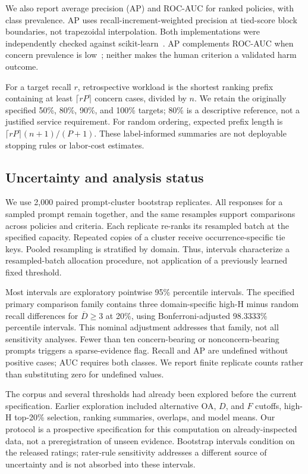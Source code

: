 \documentclass[manuscript,screen,review,anonymous]{acmart}
\newcommand{\Dcrit}{\ensuremath{\overline{D}\geq 3}}
\begin{document}
We also report average precision (AP) and ROC-AUC for ranked policies, with class prevalence. AP uses recall-increment-weighted precision at tied-score block boundaries, not trapezoidal interpolation. Both implementations were independently checked against scikit-learn~\cite{pedregosa2011scikit}. AP complements ROC-AUC when concern prevalence is low~\cite{saito2015precision}; neither makes the human criterion a validated harm outcome.

For a target recall $r$, retrospective workload is the shortest ranking prefix containing at least $\lceil rP\rceil$ concern cases, divided by $n$. We retain the originally specified 50\%, 80\%, 90\%, and 100\% targets; 80\% is a descriptive reference, not a justified service requirement. For random ordering, expected prefix length is $\lceil rP\rceil(n+1)/(P+1)$. These label-informed summaries are not deployable stopping rules or labor-cost estimates.

\subsection{Uncertainty and analysis status}
We use 2,000 paired prompt-cluster bootstrap replicates. All responses for a sampled prompt remain together, and the same resamples support comparisons across policies and criteria. Each replicate re-ranks its resampled batch at the specified capacity. Repeated copies of a cluster receive occurrence-specific tie keys. Pooled resampling is stratified by domain. Thus, intervals characterize a resampled-batch allocation procedure, not application of a previously learned fixed threshold.

Most intervals are exploratory pointwise 95\% percentile intervals. The specified primary comparison family contains three domain-specific high-H minus random recall differences for \Dcrit{} at 20\%, using Bonferroni-adjusted 98.3333\% percentile intervals. This nominal adjustment addresses that family, not all sensitivity analyses. Fewer than ten concern-bearing or nonconcern-bearing prompts triggers a sparse-evidence flag. Recall and AP are undefined without positive cases; AUC requires both classes. We report finite replicate counts rather than substituting zero for undefined values.

The corpus and several thresholds had already been explored before the current specification. Earlier exploration included alternative OA, $D$, and $F$ cutoffs, high-H top-20\% selection, ranking summaries, overlaps, and model means. Our protocol is a prospective specification for this computation on already-inspected data, not a preregistration of unseen evidence. Bootstrap intervals condition on the released ratings; rater-rule sensitivity addresses a different source of uncertainty and is not absorbed into these intervals.
\end{document}

